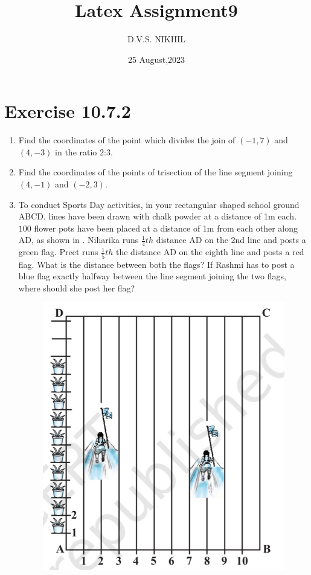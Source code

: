\documentclass{article}
\theoremstyle{remark}
\begin{document}
\title{Latex Assignment9}
\author{D.V.S. NIKHIL}
\date{25 August,2023}
\maketitle
\section*{Exercise 10.7.2}
\begin{enumerate}
\item Find the coordinates of the point which divides the join of $(-1,7)$ and $(4,-3)$ in the ratio 2:3.
\item Find the coordinates of the points of trisection of the line segment joining $(4,-1)$ and $(-2,3)$.
\item To conduct Sports Day activities, in your rectangular shaped school ground ABCD, lines have been drawn with chalk powder at a distance of 1m each. $100$ flower pots have been placed at a distance of 1m from each other along AD, as shown in . Niharika runs $\frac {1}{4}th$ distance AD on the 2nd line and posts a green flag. Preet runs $\frac {1}{5}th$ the distance AD on the eighth line and posts a red flag. What is the distance between both the flags? If Rashmi has to post a blue flag exactly halfway between the line segment joining the two flags, where should she post her flag?
\begin{figure}[ht]
\centering
\includegraphics[width=\columnwidth]{figs/7.12.png}

\end{figure}
\end{enumerate}
\end{document}

